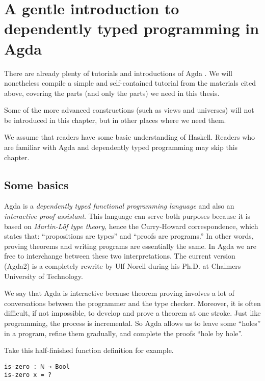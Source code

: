 \documentclass[\main/thesis.tex]{subfiles}
\begin{document}
\chapter{A gentle introduction to dependently typed programming in Agda}\label{agda}


There are already plenty of tutorials and introductions of Agda
\cite{norell2009dependently}\cite{FLOLAC16DTP}\cite{brutal}.
We will nonetheless compile a simple and self-contained tutorial from the
materials cited above, covering the parts (and only the parts) we need in this thesis.

Some of the more advanced constructions (such as views and universes) will not
be introduced in this chapter, but in other places where we need them.

We assume that readers have some basic understanding of Haskell. Readers who are
familiar with Agda and dependently typed programming may skip this chapter.

\section{Some basics}


Agda is a \textit{dependently typed functional programming language} and also an
\textit{interactive proof assistant}. This language can serve both purposes because
it is based on \textit{Martin-Löf type theory}\cite{martin1984intuitionistic},
hence the Curry-Howard correspondence\cite{sorensen2006lectures},
which states that: ``propositions are types'' and ``proofs are programs.''
In other words, proving theorems and writing programs are essentially the same.
In Agda we are free to interchange between these two interpretations.
The current version (Agda2) is a completely rewrite by Ulf Norell during his
Ph.D. at Chalmers University of Technology.

We say that Agda is interactive because theorem proving involves a lot of
conversations between the programmer and the type checker.
Moreover, it is often difficult, if not impossible, to develop and prove a theorem at one stroke.
Just like programming, the process is incremental.
So Agda allows us to leave some ``holes'' in a program, refine them gradually, and
complete the proofs ``hole by hole''.

Take this half-finished function definition for example.

\begin{lstlisting}
is-zero : ℕ → Bool
is-zero x = ?
\end{lstlisting}
\end{document}
